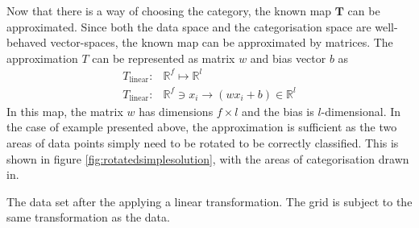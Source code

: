 \documentclass[a4paper, justified]{tufte-handout}
\begin{document}
Now that there is a way of choosing the category, the known map $\mathbf{T}$ can be approximated. Since both the data space and the categorisation space are well-behaved vector-spaces, the known map can be approximated by matrices. The approximation $T$ can be represented as matrix $w$ and bias vector $b$ as
\begin{align}
T_\text{linear}:&\mathbb{R}^f \mapsto \mathbb{R}^l\nonumber\\
T_\text{linear}:&\mathbb{R}^f \ni x_i \to (w x_i + b) \in \mathbb{R}^l 
\end{align}
In this map, the matrix $w$ has dimensions $f \times l$ and the bias is $l$-dimensional. In the case of example presented above, the approximation is sufficient as the two areas of data points simply need to be rotated to be correctly classified. This is shown in figure \ref{fig:rotatedsimplesolution}, with the areas of categorisation drawn in.

\begin{marginfigure}
\caption{The data set after the applying a linear transformation. The grid is subject to the same transformation as the data.}\label{fig:rotatedsimplesolution}
\end{marginfigure}
\end{document}
